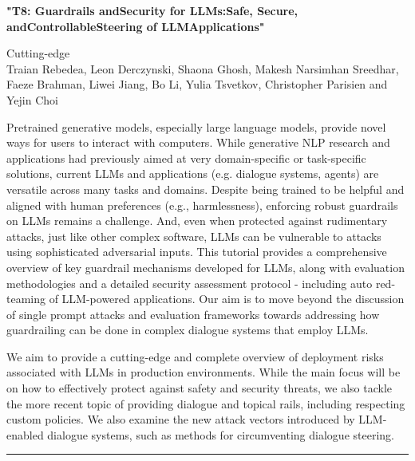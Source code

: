 \begin{center}
    \Large{\textbf{"T8: Guardrails andSecurity for LLMs:Safe, Secure, andControllableSteering of LLMApplications"}\\}
    \par\bigskip
    \large{Cutting-edge}\\
    \large{Traian Rebedea, Leon Derczynski, Shaona Ghosh, Makesh Narsimhan Sreedhar, \\
Faeze Brahman, Liwei Jiang, Bo Li, Yulia Tsvetkov, Christopher Parisien and Yejin Choi}\\
    \par\bigskip

\end{center}

Pretrained generative models, especially large language models, provide novel ways for users to interact with computers. While generative NLP research and applications had previously aimed at very domain-specific or task-specific solutions, current LLMs and applications (e.g. dialogue systems, agents) are versatile across many tasks and domains. Despite being trained to be helpful and aligned with human preferences (e.g., harmlessness), enforcing robust guardrails on LLMs remains a challenge. And, even when protected against rudimentary attacks, just like other complex software, LLMs can be vulnerable to attacks using sophisticated adversarial inputs. This tutorial provides a comprehensive overview of key guardrail mechanisms developed for LLMs, along with evaluation methodologies and a detailed security assessment protocol - including auto red-teaming of LLM-powered applications. Our aim is to move beyond the discussion of single prompt attacks and evaluation frameworks towards addressing how guardrailing can be done in complex dialogue systems that employ LLMs.

We aim to provide a cutting-edge and complete overview of deployment risks associated with LLMs in production environments. While the main focus will be on how to effectively protect against safety and security threats, we also tackle the more recent topic of providing dialogue and topical rails, including respecting custom policies. We also examine the new attack vectors introduced by LLM-enabled dialogue systems, such as methods for circumventing dialogue steering.
\begin{center}
    \noindent\rule{200px}{1pt}
\end{center}
